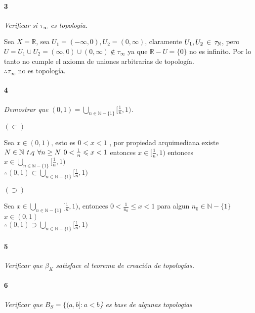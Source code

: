 \documentclass[12pt]{article}
\begin{document}
\paragraph{3}
\textit{Verificar si $\tau_{\infty}$ es topologia.} 

Sea $X=\mathbb{R}$, sea $U_1 = (-\infty,0),U_2 = (0,\infty)$, claramente $U_1,U_{2}\hspace{2px}\in\hspace{2px}\tau_{\mathbb{N}}$, pero $U=U_1\cup U_2 = (\infty,0)\cup(0,\infty)\notin \tau_{\infty}$
ya que $\mathbb{R}-U=\{0\}$ no es infinito. Por lo tanto no cumple el axioma de uniones arbitrarias de topología.\\ $\therefore\tau_{\infty}$ no es topología.\\

\paragraph{4}
\textit{Demostrar que $(0,1)=\bigcup\limits_{n\in\mathbb{N}-\{1\}}[\frac{1}{n},1)$.}

$(\subset)$

Sea $x\in(0,1)$, esto es $0<x<1$ , por propiedad arquimediana existe $ N \in\mathbb{N}\hspace{4px}t.q \hspace{4px} \forall n\geq N \hspace{4px} 0< \frac{1}{n} \leqslant  x<1$ entonces $x\in[\frac{1}{n},1)$
entonces $x\in\bigcup\limits_{n\in\mathbb{N}-\{1\}}[\frac{1}{n},1)$\\$\therefore(0,1)\subset\bigcup\limits_{n\in\mathbb{N}-\{1\}}[\frac{1}{n},1)$

$(\supset)$

Sea $x\in\bigcup\limits_{n\in\mathbb{N}-\{1\}}[\frac{1}{n},1)$, entonces $0<\frac{1}{n_0}\leq x<1$ para algun $n_0\in\mathbb{N}-\{1\}$\\$x\in(0,1)$\\$\therefore(0,1)\supset\bigcup\limits_{n\in\mathbb{N}-\{1\}}[\frac{1}{n},1)$

\paragraph{5}
\textit{Verificar que $\beta_K$ satisface el teorema de creación de topologías.}
\paragraph{6}
\textit{Verificar que $B_S=\{(a,b]:a<b$\} es base de algunas topologias}
\end{document}
